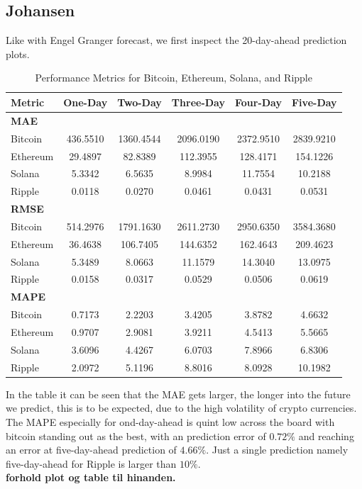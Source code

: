 \subsection{Johansen}
Like with Engel Granger forecast, we first inspect the 20-day-ahead prediction plots. 


\begin{table}[H]
\centering
\caption{Performance Metrics for Bitcoin, Ethereum, Solana, and Ripple}
\begin{tabular}{lccccc}
\toprule
\textbf{Metric} & \textbf{One-Day} & \textbf{Two-Day} & \textbf{Three-Day} & \textbf{Four-Day} & \textbf{Five-Day} \\
\midrule
\textbf{MAE} & & & & & \\
Bitcoin   & 436.5510 & 1360.4544 & 2096.0190 & 2372.9510 & 2839.9210 \\
Ethereum  &  29.4897 &   82.8389 &  112.3955 &  128.4171 &  154.1226 \\
Solana    &   5.3342 &    6.5635 &    8.9984 &   11.7554 &   10.2188 \\
Ripple    &   0.0118 &    0.0270 &    0.0461 &    0.0431 &    0.0531 \\
\midrule
\textbf{RMSE} & & & & & \\
Bitcoin   & 514.2976 & 1791.1630 & 2611.2730 & 2950.6350 & 3584.3680 \\
Ethereum  &  36.4638 &  106.7405 &  144.6352 &  162.4643 &  209.4623 \\
Solana    &   5.3489 &    8.0663 &   11.1579 &   14.3040 &   13.0975 \\
Ripple    &   0.0158 &    0.0317 &    0.0529 &    0.0506 &    0.0619 \\
\midrule
\textbf{MAPE} & & & & & \\
Bitcoin   &   0.7173 &    2.2203 &    3.4205 &    3.8782 &    4.6632 \\
Ethereum  &   0.9707 &    2.9081 &    3.9211 &    4.5413 &    5.5665 \\
Solana    &   3.6096 &    4.4267 &    6.0703 &    7.8966 &    6.8306 \\
Ripple    &   2.0972 &    5.1196 &    8.8016 &    8.0928 &   10.1982 \\
\bottomrule
\end{tabular}
\end{table}
\noindent In the table it can be seen that the MAE gets larger, the longer into the future we predict, this is to be expected, due to the high volatility of crypto currencies. The MAPE especially for ond-day-ahead is quint low across the board with bitcoin standing out as the best, with an prediction error of $0.72\%$ and reaching an error at five-day-ahead prediction of $4.66\%$. Just a single prediction namely five-day-ahead for Ripple is larger than $10\%$.\\
\textbf{forhold plot og table til hinanden.}